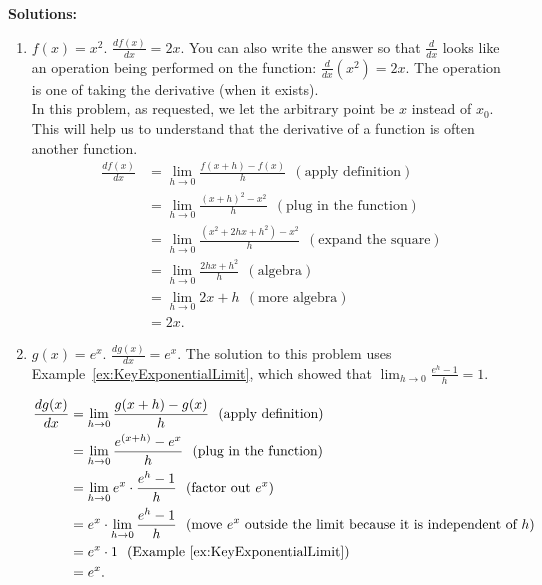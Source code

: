 \textbf{Solutions:} 


\begin{enumerate}
\renewcommand{\labelenumi}{(\alph{enumi})}
\setlength{\itemsep}{.2cm}
    \item $f(x)= x^2$. \Ans $\frac{ df(x) }{d x} = 2x$. You can also write the answer so that $\frac{d}{dx}$ looks like an operation being performed on the function: $\frac{ d }{d x}\left(x^2\right) = 2x$. The operation is one of taking the derivative (when it exists).\\
    
In this problem, as requested, we let the arbitrary point be $x$ instead of $x_0$. This will help us to understand that the derivative of a function is often another function.
\begin{align*}
    \frac{ df(x) }{d x} &= \lim_{h \to 0}  \frac{ f(x+h) - f(x)}{h}  ~~(\text{apply definition})\\
    &= \lim_{h \to 0}  \frac{ (x+h)^2 - x^2}{h}  ~~(\text{plug in the function})\\
    &= \lim_{h \to 0}  \frac{ (x^2 + 2h x + h^2) - x^2}{h}  ~~(\text{expand the square})\\
    &=  \lim_{h \to 0}  \frac{ 2h x + h^2}{h} ~~(\text{algebra})\\
    & = \lim_{h \to 0}  2 x + h ~~(\text{more algebra})\\
    & = 2x.
\end{align*}
    
    
    \item $g(x) = e^{x}$.   \Ans $\frac{ dg(x) }{d x} = e^{x}$.  The solution to this problem uses Example~\ref{ex:KeyExponentialLimit}, which showed that $ \displaystyle \lim_{h \to 0}  \frac{ e^{h} - 1}{h} =1$.

\begin{align*}
    \frac{ dg(x) }{d x} &= \lim_{h \to 0}  \frac{ g(x+h) - g(x)}{h}  ~~(\text{apply definition})\\
    &= \lim_{h \to 0}  \frac{ e^{(x+h)} - e^{x}}{h}  ~~(\text{plug in the function})\\
    &= \lim_{h \to 0}  e^{x} \cdot \frac{ e^{h} - 1}{h}  ~~(\text{factor out}~ e^{x})\\
    &= e^{x} \cdot \lim_{h \to 0}  \frac{ e^{h} - 1}{h}  ~~(\text{move }e^x \text{ outside the limit because it is independent of}~ h)\\
    & = e^x \cdot 1 ~~(\text{Example}~\ref{ex:KeyExponentialLimit}) \\
    & = e^x.
\end{align*}
    

\end{enumerate}
